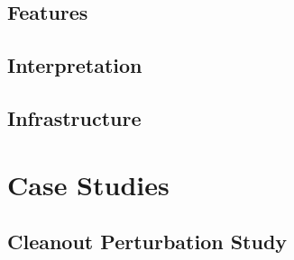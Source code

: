 \documentclass{article}
\begin{document}
\subsection{Features}

\subsection{Interpretation}

\subsection{Infrastructure}

\section{Case Studies}

\subsection{Cleanout Perturbation Study}



\end{document}
